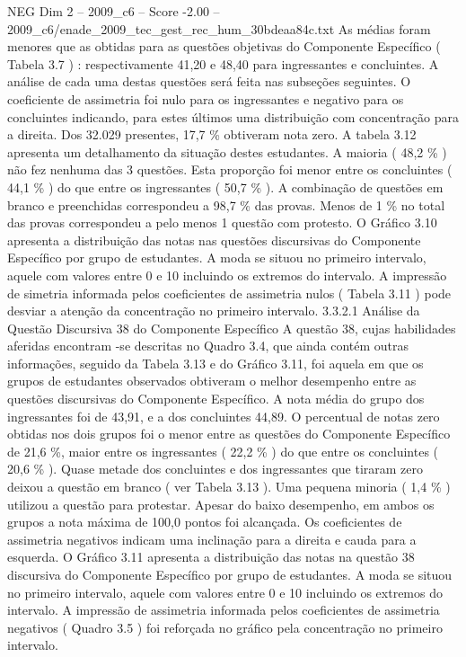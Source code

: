 \begin{textsample}{NEG Dim 2 – 2009\_c6 – Score -2.00 – 2009\_c6/enade\_2009\_tec\_gest\_rec\_hum\_30bdeaa84c.txt}
As médias foram menores que as obtidas para as questões objetivas do Componente Específico ( Tabela 3.7 ) : respectivamente 41,20 e 48,40 para ingressantes e concluintes.
A análise de cada uma destas questões será feita nas subseções seguintes.
O coeficiente de assimetria foi nulo para os ingressantes e negativo para os concluintes indicando, para estes últimos uma distribuição com concentração para a direita.
Dos 32.029 presentes, 17,7 \% obtiveram nota zero.
A tabela 3.12 apresenta um detalhamento da situação destes estudantes.
A maioria ( 48,2 \% ) não fez nenhuma das 3 questões.
Esta proporção foi menor entre os concluintes ( 44,1 \% ) do que entre os ingressantes ( 50,7 \% ).
A combinação de questões em branco e preenchidas correspondeu a 98,7 \% das provas.
Menos de 1 \% no total das provas correspondeu a pelo menos 1 questão com protesto.
O Gráfico 3.10 apresenta a distribuição das notas nas questões discursivas do Componente Específico por grupo de estudantes.
A moda se situou no primeiro intervalo, aquele com valores entre 0 e 10 incluindo os extremos do intervalo.
A impressão de simetria informada pelos coeficientes de assimetria nulos ( Tabela 3.11 ) pode desviar a atenção da concentração no primeiro intervalo. 3.3.2.1 Análise da Questão Discursiva 38 do Componente Específico A questão 38, cujas habilidades aferidas encontram -se descritas no Quadro 3.4, que ainda contém outras informações, seguido da Tabela 3.13 e do Gráfico 3.11, foi aquela em que os grupos de estudantes observados obtiveram o melhor desempenho entre as questões discursivas do Componente Específico.
A nota média do grupo dos ingressantes foi de 43,91, e a dos concluintes 44,89.
O percentual de notas zero obtidas nos dois grupos foi o menor entre as questões do Componente Específico de 21,6 \%, maior entre os ingressantes ( 22,2 \% ) do que entre os concluintes ( 20,6 \% ).
Quase metade dos concluintes e dos ingressantes que tiraram zero deixou a questão em branco ( ver Tabela 3.13 ).
Uma pequena minoria ( 1,4 \% ) utilizou a questão para protestar.
Apesar do baixo desempenho, em ambos os grupos a nota máxima de 100,0 pontos foi alcançada.
Os coeficientes de assimetria negativos indicam uma inclinação para a direita e cauda para a esquerda.
O Gráfico 3.11 apresenta a distribuição das notas na questão 38 discursiva do Componente Específico por grupo de estudantes.
A moda se situou no primeiro intervalo, aquele com valores entre 0 e 10 incluindo os extremos do intervalo.
A impressão de assimetria informada pelos coeficientes de assimetria negativos ( Quadro 3.5 ) foi reforçada no gráfico pela concentração no primeiro intervalo.

\end{textsample}
